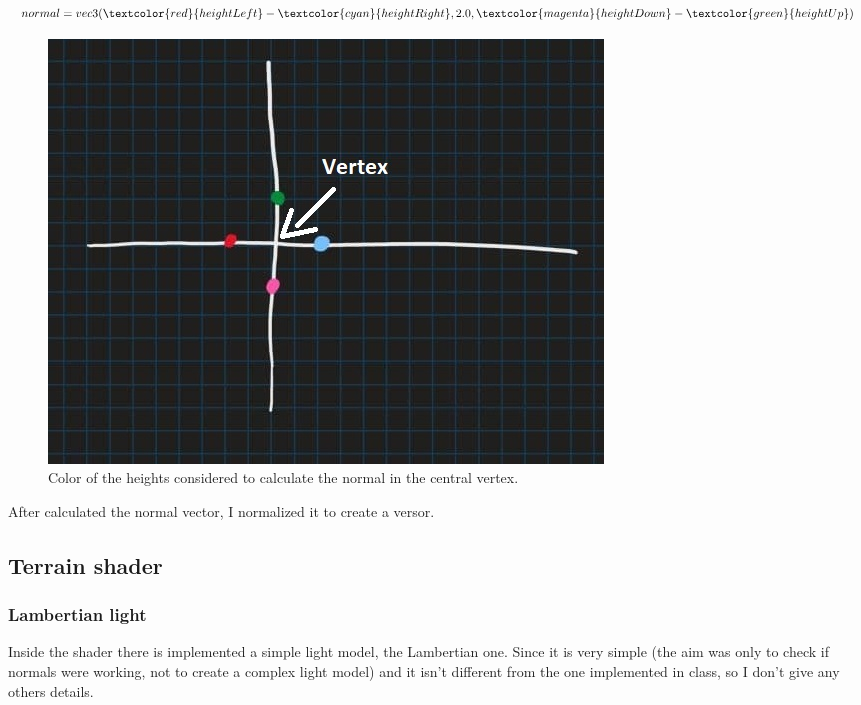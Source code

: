 \begin{equation}
	normal = vec3(\textcolor{red}{heightLeft} - \textcolor{cyan}{heightRight}, 2.0, \textcolor{magenta}{heightDown} - \textcolor{green}{heightUp})		
\end{equation}

\begin{figure}[hbt!]
	\centering
	\includegraphics[width= 1
	\textwidth]{images/normalSchema.jpg}
	\caption{Color of the heights considered to calculate the normal in the central vertex.}
\end{figure} 

\noindent
After calculated the normal vector, I normalized it to create a versor.

\subsection{Terrain shader}

\subsubsection{Lambertian light}
Inside the shader there is implemented a simple light model, the Lambertian one. Since it is very simple (the aim was only to check if normals were working, not to create a complex light model) and it isn't different from the one implemented in class, so I don't give any others details.

